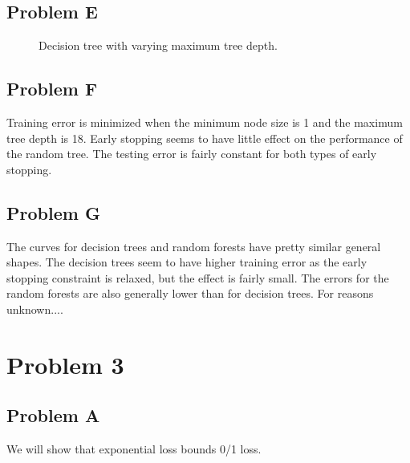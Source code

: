 \documentclass[12pt]{article} %
\begin{document}
\subsection{Problem E}

\begin{figure}[H]
	\vspace{-10mm}
	\caption{Decision tree with varying maximum tree depth.}
\end{figure}

\subsection{Problem F}
Training error is minimized when the minimum node size is 1 and the maximum tree depth is 18.  Early stopping seems to have little effect on the performance of the random tree. The testing error is fairly constant for both types of early stopping.

\subsection{Problem G}
The curves for decision trees and random forests have pretty similar general shapes. The decision trees seem to have higher training error as the early stopping constraint is relaxed, but the effect is fairly small. The errors for the random forests are also generally lower than for decision trees. For reasons unknown....

\section{Problem 3}

\subsection{Problem A}
We will show that exponential loss bounds 0/1 loss.
\end{document}
